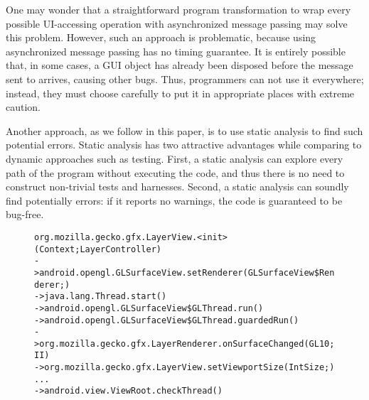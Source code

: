 One may wonder that a straightforward program transformation to wrap
every possible UI-accessing operation with asynchronized message passing
may solve this problem. However, such an approach is problematic,
because using asynchronized message passing has no timing
guarantee. It is entirely possible that, in some cases, a GUI object has already been
disposed before the message sent to arrives, causing other bugs. Thus, programmers can not use
it everywhere; instead, they must choose carefully to put it in appropriate places
with extreme caution.


Another approach, as we follow in this paper, is to
use static analysis to find such potential errors.
Static analysis has two attractive advantages while comparing to dynamic approaches such as
 testing.
First, a static analysis can explore every path of the program without executing the code, and
thus there is no need to construct non-trivial tests and harnesses.
Second, a static analysis can soundly find potentially errors: if it
reports no warnings, the code is guaranteed to be bug-free. 


\begin{figure}[t]
\begin{CodeOut}
\begin{alltt}

   org.mozilla.gecko.gfx.LayerView.<init>(Context;LayerController)
-> android.opengl.GLSurfaceView.setRenderer(GLSurfaceView\$Renderer;)
-> java.lang.Thread.start()
-> android.opengl.GLSurfaceView\$GLThread.run()
-> android.opengl.GLSurfaceView\$GLThread.guardedRun()
-> org.mozilla.gecko.gfx.LayerRenderer.onSurfaceChanged(GL10;II)
-> org.mozilla.gecko.gfx.LayerView.setViewportSize(IntSize;)
...
-> android.view.ViewRoot.checkThread()
\end{alltt}
\end{CodeOut}
\vspace*{-2.0ex}  %
\end{figure}

